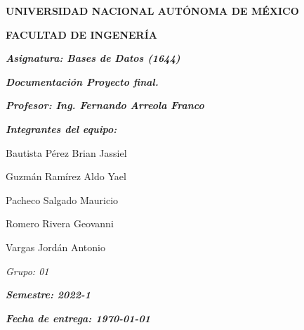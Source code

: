 \documentclass[letterpaper,12pt]{article}
\begin{document}
	\begin{figure}
		\hfill
	\end{figure}

	\begin{titlepage}
		\centering
		{\bfseries\LARGE UNIVERSIDAD NACIONAL AUT\'ONOMA DE M\'EXICO \par}
		\vspace{1cm}
		{\bfseries\LARGE FACULTAD DE INGENER\'IA \par}
		\vspace{1cm}
		{\itshape\Large\textbf{Asignatura: Bases de Datos (1644)}\par}
		\vspace{1cm}
		{\itshape\Large\textbf{Documentación Proyecto final.}\par}
		\vspace{1cm}
		{\itshape\Large \textbf{Profesor: Ing. Fernando Arreola Franco}
			\par}
		\vspace{1cm}
		\vfill
		{\itshape\Large \textbf{Integrantes del equipo:}\\\par}

		\begin{itemize}

			\centering

			{\itshape\Large

				\item [\textbullet] Bautista P\'erez Brian Jassiel

				\item [\textbullet] Guzmán Ramírez Aldo Yael
				\item [\textbullet] Pacheco Salgado Mauricio
				\item [\textbullet] Romero Rivera Geovanni
				\item [\textbullet] Vargas Jordán Antonio}

		\end{itemize}
		\vfill
		{\itshape\Large Grupo: 01\par}
		{\itshape\Large \textbf{Semestre: 2022-1}\par}
		{\itshape\Large \textbf{Fecha de entrega: \today}\par}
	\end{titlepage}

	\tableofcontents
	\newpage
	
\end{document}

